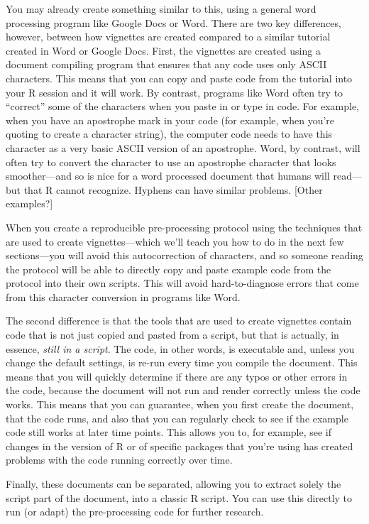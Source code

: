 \documentclass[]{tufte-book}
\begin{document}
You may already create something similar to this, using a general word
processing program like Google Docs or Word. There are two key differences,
however, between how vignettes are created compared to a similar tutorial
created in Word or Google Docs. First, the vignettes are created using
a document compiling program that ensures that any code uses only ASCII
characters. This means that you can copy and paste code from the tutorial
into your R session and it will work. By contrast, programs like Word often
try to ``correct'' some of the characters when you paste in or type in code.
For example, when you have an apostrophe mark in your code (for example,
when you're quoting to create a character string), the computer code needs
to have this character as a very basic ASCII version of an apostrophe. Word,
by contrast, will often try to convert the character to use an apostrophe
character that looks smoother---and so is nice for a word processed document
that humans will read---but that R cannot recognize. Hyphens can have similar
problems. {[}Other examples?{]}

When you create a reproducible pre-processing protocol using the techniques that
are used to create vignettes---which we'll teach you how to do in the next few
sections---you will avoid this autocorrection of characters, and so someone
reading the protocol will be able to directly copy and paste example code from
the protocol into their own scripts. This will avoid hard-to-diagnose errors
that come from this character conversion in programs like Word.

The second difference is that the tools that are used to create vignettes
contain code that is not just copied and pasted from a script, but that is
actually, in essence, \emph{still in a script}. The code, in other words, is
executable and, unless you change the default settings, is re-run every
time you compile the document. This means that you will quickly determine if
there are any typos or other errors in the code, because the document will
not run and render correctly unless the code works. This means that you can
guarantee, when you first create the document, that the code runs, and also
that you can regularly check to see if the example code still works at
later time points. This allows you to, for example, see if changes in the
version of R or of specific packages that you're using has created problems
with the code running correctly over time.

Finally, these documents can be separated, allowing you to extract solely the
script part of the document, into a classic R script. You can use this directly
to run (or adapt) the pre-processing code for further research.
\end{document}
